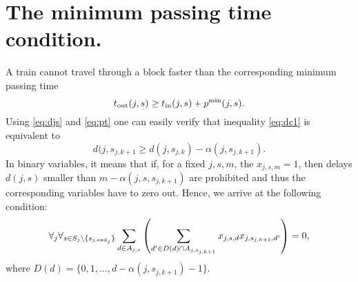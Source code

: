 \section{The minimum passing time condition.}
A train cannot travel through a block faster than the corresponding minimum
passing time
\begin{equation}
  \label{eq:dc1}
  t_\text{out}(j, s) \ge t_\text{in}(j, s) + p^\text{min}(j, s).
\end{equation}
Using \eqref{eq:djs} and \eqref{eq:pt} one can easily verify that inequality
\eqref{eq:dc1} is equivalent to
\begin{equation}
  \label{eq:passingtime}
  d(j, s_{j,k+1} \ge d(j, s_{j,k}) - \alpha(j, s_{j,k+1}).
\end{equation}
In binary variables, it means that if, for a fixed $j,s,m$, the $x_{j,s,m}=1$,
then delays $d(j,s)$ smaller than $m-\alpha(j, s, s_{j,k+1})$ are prohibited
and thus the corresponding variables have to zero out. Hence, we arrive at the
following condition:
\begin{equation}
  \label{eq:qubo:passingtime}
  \forall_{j} \forall_{s \in S_j \setminus \{s_{{j,\operatorname*{end}_{j}}}\}}
  \sum_{d \in A_{j,s}}
  \left(
  \sum_{ d' \in D(d) \cap A_{j, s_{j,k+1}}} x_{j, s, d}
  x_{j, s_{j,k+1}, d'} \right) = 0,
\end{equation}
where $D(d) = \{0, 1, \ldots, d - \alpha(j, s_{j,k+1}) -1\}$.
